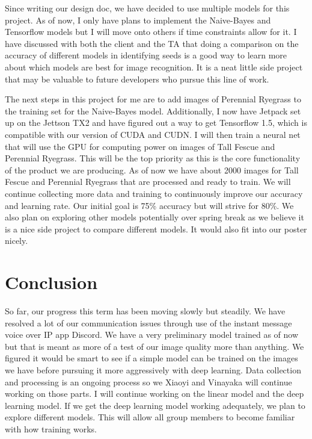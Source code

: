 \documentclass[onecolumn, draftclsnofoot,10pt, compsoc]{IEEEtran}
\begin{document}
Since writing our design doc, we have decided to use multiple models for this project. As of now, I only have plans to implement the Naive-Bayes and Tensorflow models but I will move onto others if time constraints allow for it. I have discussed with both the client and the TA that doing a comparison on the accuracy of different models in identifying seeds is a good way to learn more about which models are best for image recognition. It is a neat little side project that may be valuable to future developers who pursue this line of work.

The next steps in this project for me are to add images of Perennial Ryegrass to the training set for the Naive-Bayes model. Additionally, I now have Jetpack set up on the Jettson TX2 and have figured out a way to get Tensorflow 1.5, which is compatible with our version of CUDA and CUDN. I will then train a neural net that will use the GPU for computing power on images of Tall Fescue and Perennial Ryegrass. This will be the top priority as this is the core functionality of the product we are producing. As of now we have about 2000 images for Tall Fescue and Perennial Ryegrass that are processed and ready to train. We will continue collecting more data and training to continuously improve our accuracy and learning rate. Our initial goal is 75\% accuracy but will strive for 80\%. We also plan on exploring other models potentially over spring break as we believe it is a nice side project to compare different models. It would also fit into our poster nicely.

\section{Conclusion}
So far, our progress this term has been moving slowly but steadily. We have resolved a lot of our communication issues through use of the instant message voice over IP app Discord. We have a very preliminary model trained as of now but that is meant as more of a test of our image quality more than anything. We figured it would be smart to see if a simple model can be trained on the images we have before pursuing it more aggressively with deep learning. Data collection and processing is an ongoing process so we Xiaoyi and Vinayaka will continue working on those parts. I will continue working on the linear model and the deep learning model. If we get the deep learning model working adequately, we plan to explore different models. This will allow all group members to become familiar with how training works.
\end{document}

